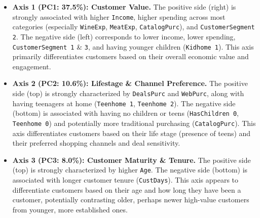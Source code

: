 \begin{itemize}
    \item \textbf{Axis 1 (PC1: 37.5\%): Customer Value.} The positive side (right) is strongly associated with higher \texttt{Income}, higher spending across most categories (especially \texttt{WineExp}, \texttt{MeatExp}, \texttt{CatalogPurc}), and \texttt{CustomerSegment 2}. The negative side (left) corresponds to lower income, lower spending, \texttt{CustomerSegment 1} \& \texttt{3}, and having younger children (\texttt{Kidhome 1}). This axis primarily differentiates customers based on their overall economic value and engagement.
    
    \item \textbf{Axis 2 (PC2: 10.6\%): Lifestage \& Channel Preference.} The positive side (top) is strongly characterized by \texttt{DealsPurc} and \texttt{WebPurc}, along with having teenagers at home (\texttt{Teenhome 1}, \texttt{Teenhome 2}). The negative side (bottom) is associated with having no children or teens (\texttt{HasChildren 0}, \texttt{Teenhome 0}) and potentially more traditional purchasing (\texttt{CatalogPurc}). This axis differentiates customers based on their life stage (presence of teens) and their preferred shopping channels and deal sensitivity.
    
    \item \textbf{Axis 3 (PC3: 8.0\%): Customer Maturity \& Tenure.} The positive side (top) is strongly characterized by higher \texttt{Age}. The negative side (bottom) is associated with longer customer tenure (\texttt{CustDays}). This axis appears to differentiate customers based on their age and how long they have been a customer, potentially contrasting older, perhaps newer high-value customers from younger, more established ones.
\end{itemize}

